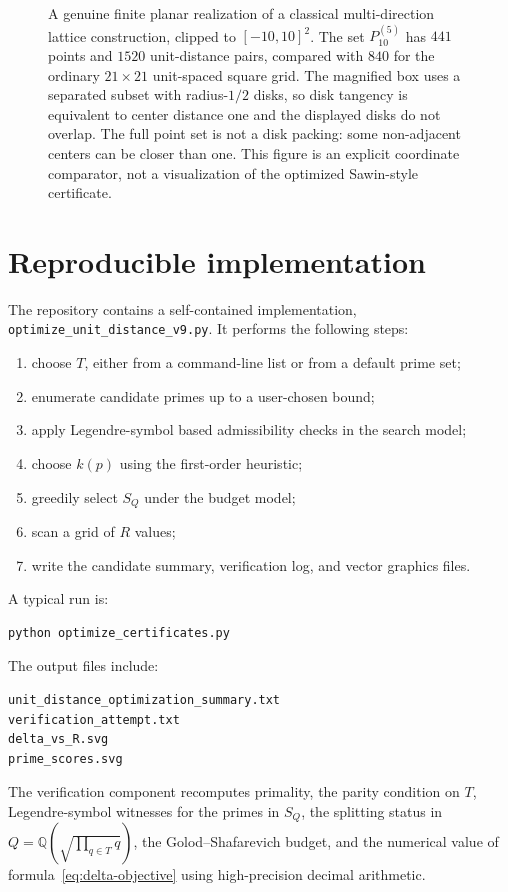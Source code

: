 \documentclass[a4paper,12pt]{article}
\begin{document}
\begin{figure}[htbp]
\caption{A genuine finite planar realization of a classical multi-direction lattice construction, clipped to $[-10,10]^2$.  The set $P_{10}^{(5)}$ has $441$ points and $1520$ unit-distance pairs, compared with $840$ for the ordinary $21\times21$ unit-spaced square grid.  The magnified box uses a separated subset with radius-$1/2$ disks, so disk tangency is equivalent to center distance one and the displayed disks do not overlap.  The full point set is not a disk packing: some non-adjacent centers can be closer than one. This figure is an explicit coordinate comparator, not a visualization of the optimized Sawin-style certificate.}
\label{fig:explicit-erdos-d5}
\end{figure}

\section{Reproducible implementation}

The repository contains a self-contained implementation, \texttt{optimize\_unit\_distance\_v9.py}.  It performs the following steps:
\begin{enumerate}
  \item choose $T$, either from a command-line list or from a default prime set;
  \item enumerate candidate primes up to a user-chosen bound;
  \item apply Legendre-symbol based admissibility checks in the search model;
  \item choose $k(p)$ using the first-order heuristic;
  \item greedily select $S_Q$ under the budget model;
  \item scan a grid of $R$ values;
  \item write the candidate summary, verification log, and vector graphics files.
\end{enumerate}
A typical run is:
\begin{verbatim}
python optimize_certificates.py
\end{verbatim}
The output files include:
\begin{verbatim}
unit_distance_optimization_summary.txt
verification_attempt.txt
delta_vs_R.svg
prime_scores.svg
\end{verbatim}
The verification component recomputes primality, the parity condition on $T$, Legendre-symbol witnesses for the primes in $S_Q$, the splitting status in $Q=\mathbb Q(\sqrt{\prod_{q\in T}q})$, the Golod--Shafarevich budget, and the numerical value of formula~\eqref{eq:delta-objective} using high-precision decimal arithmetic.
\end{document}
